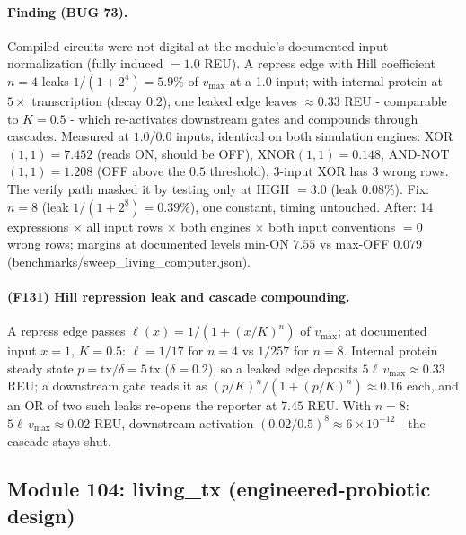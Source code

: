 \paragraph{Finding (BUG 73).} Compiled circuits were not digital at the module's documented input normalization (fully induced $=1.0$ REU). A repress edge with Hill coefficient $n=4$ leaks $1/(1+2^4)=5.9\%$ of $v_{\max}$ at a 1.0 input; with internal protein at $5\times$ transcription (decay $0.2$), one leaked edge leaves $\approx0.33$ REU - comparable to $K=0.5$ - which re-activates downstream gates and compounds through cascades. Measured at $1.0/0.0$ inputs, identical on both simulation engines: XOR$(1,1)=7.452$ (reads ON, should be OFF), XNOR$(1,1)=0.148$, AND-NOT$(1,1)=1.208$ (OFF above the $0.5$ threshold), 3-input XOR has 3 wrong rows. The verify path masked it by testing only at HIGH $=3.0$ (leak $0.08\%$). Fix: $n=8$ (leak $1/(1+2^8)=0.39\%$), one constant, timing untouched. After: 14 expressions $\times$ all input rows $\times$ both engines $\times$ both input conventions $=0$ wrong rows; margins at documented levels min-ON $7.55$ vs max-OFF $0.079$ (benchmarks/sweep\_living\_computer.json).
\paragraph{(F131) Hill repression leak and cascade compounding.} A repress edge passes $\ell(x)=1/(1+(x/K)^n)$ of $v_{\max}$; at documented input $x=1$, $K=0.5$: $\ell=1/17$ for $n=4$ vs $1/257$ for $n=8$. Internal protein steady state $p=\mathrm{tx}/\delta=5\,\mathrm{tx}$ ($\delta=0.2$), so a leaked edge deposits $5\ell\,v_{\max}\approx0.33$ REU; a downstream gate reads it as $(p/K)^n/(1+(p/K)^n)\approx0.16$ each, and an OR of two such leaks re-opens the reporter at $7.45$ REU. With $n=8$: $5\ell\,v_{\max}\approx0.02$ REU, downstream activation $(0.02/0.5)^8\approx6\times10^{-12}$ - the cascade stays shut.
\subsection{Module 104: living\_tx (engineered-probiotic design)}
